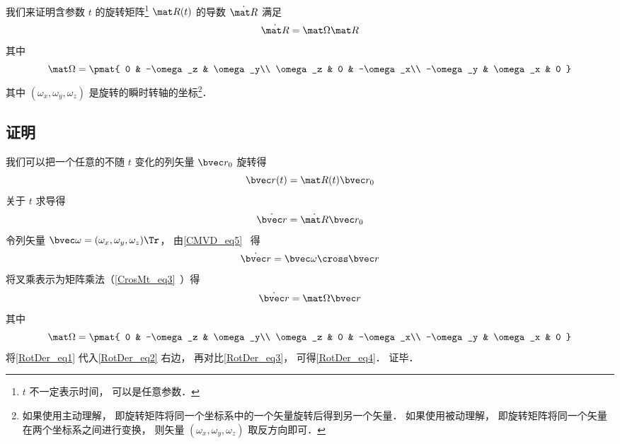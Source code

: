 

我们来证明含参数 $t$ 的旋转矩阵\footnote{$t$ 不一定表示时间， 可以是任意参数．} $\mat R(t)$ 的导数 $\dot{\mat R}$ 满足
\begin{equation}\label{RotDer_eq4}
\dot{\mat R} = \mat \Omega \mat R
\end{equation}
其中
\begin{equation}
\mat \Omega = \pmat{
0 & -\omega_z & \omega_y\\
\omega_z & 0 & -\omega_x\\
-\omega_y & \omega_x & 0
}
\end{equation}
其中 $(\omega_x, \omega_y, \omega_z)$ 是旋转的瞬时转轴的坐标\footnote{如果使用主动理解， 即旋转矩阵将同一个坐标系中的一个矢量旋转后得到另一个矢量． 如果使用被动理解， 即旋转矩阵将同一个矢量在两个坐标系之间进行变换， 则矢量 $(\omega_x, \omega_y, \omega_z)$ 取反方向即可．}．%

\subsection{证明}
我们可以把一个任意的不随 $t$ 变化的列矢量 $\bvec r_0$ 旋转得
\begin{equation}\label{RotDer_eq1}
\bvec r(t) = \mat R(t) \bvec r_0
\end{equation}
关于 $t$ 求导得
\begin{equation}\label{RotDer_eq3}
\dot{\bvec r} = \dot{\mat R} \bvec r_0
\end{equation}
令列矢量 $\bvec \omega = (\omega_x, \omega_y, \omega_z)\Tr$， 由\autoref{CMVD_eq5}~ 得
\begin{equation}\label{RotDer_eq5}
\dot{\bvec r} = \bvec\omega \cross \bvec r
\end{equation}
将叉乘表示为矩阵乘法（\autoref{CrosMt_eq3}~）得
\begin{equation}\label{RotDer_eq2}
\dot{\bvec r} = \mat\Omega \bvec r
\end{equation}
其中
\begin{equation}
\mat \Omega = \pmat{
0 & -\omega_z & \omega_y\\
\omega_z & 0 & -\omega_x\\
-\omega_y & \omega_x & 0
}\end{equation}
将\autoref{RotDer_eq1} 代入\autoref{RotDer_eq2} 右边， 再对比\autoref{RotDer_eq3}， 可得\autoref{RotDer_eq4}． 证毕．
